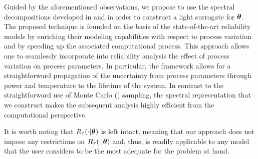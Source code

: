 Guided by the aforementioned observations, we propose to use the spectral decompositions developed in  and  in order to construct a light surrogate for $\bm{\theta}$.
The proposed technique is founded on the basis of the state-of-the-art reliability models by enriching their modeling capabilities with respect to process variation and by speeding up the associated computational process.
This approach allows one to seamlessly incorporate into reliability analysis the effect of process variation on process parameters.
In particular, the framework allows for a straightforward propagation of the uncertainty from process parameters through power and temperature to the lifetime of the system.
In contrast to the straightforward use of Monte Carlo () sampling, the spectral representation that we construct makes the subsequent analysis highly efficient from the computational perspective.

It is worth noting that $R_\tau(\cdot | \bm{\theta})$ is left intact, meaning that our approach does not impose any restrictions on $R_\tau(\cdot | \bm{\theta})$ and, thus, is readily applicable to any model that the user considers to be the most adequate for the problem at hand.
